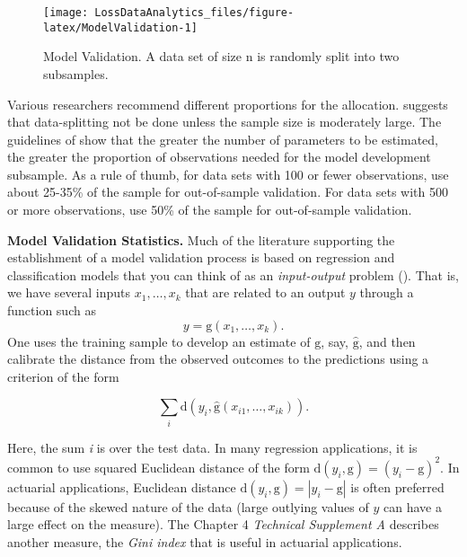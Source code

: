 \documentclass[]{book}
\theoremstyle{definition}
\theoremstyle{definition}
\theoremstyle{definition}
\theoremstyle{remark}
\begin{document}
\begin{figure}

{\centering \texttt{[image: LossDataAnalytics\_files/figure-latex/ModelValidation-1]} 

}

\caption{Model Validation. A data set of size n is randomly split into two subsamples.}\label{fig:ModelValidation}
\end{figure}

Various researchers recommend different proportions for the allocation.
\citet{snee1977validation} suggests that data-splitting not be done
unless the sample size is moderately large. The guidelines of
\citet{picard1990data} show that the greater the number of parameters to
be estimated, the greater the proportion of observations needed for the
model development subsample. As a rule of thumb, for data sets with 100
or fewer observations, use about 25-35\% of the sample for out-of-sample
validation. For data sets with 500 or more observations, use 50\% of the
sample for out-of-sample validation.

\textbf{Model Validation Statistics.} Much of the literature supporting
the establishment of a model validation process is based on regression
and classification models that you can think of as an
\emph{input-output} problem (\citet{james2013introduction}). That is, we
have several inputs \(x_1, \ldots, x_k\) that are related to an output
\(y\) through a function such as
\[y = \mathrm{g}\left(x_1, \ldots, x_k\right).\] One uses the training
sample to develop an estimate of \(\mathrm{g}\), say,
\(\hat{\mathrm{g}}\), and then calibrate the distance from the observed
outcomes to the predictions using a criterion of the form

\begin{equation}
\sum_i \mathrm{d}(y_i,\hat{\mathrm{g}}\left(x_{i1}, \ldots, x_{ik}\right) ) .
\label{eq:OutSampleCriter}
\end{equation}

Here, the sum \emph{i} is over the test data. In many regression
applications, it is common to use squared Euclidean distance of the form
\(\mathrm{d}(y_i,\mathrm{g}) = (y_i-\mathrm{g})^2\). In actuarial
applications, Euclidean distance
\(\mathrm{d}(y_i,\mathrm{g}) = |y_i-\mathrm{g}|\) is often preferred
because of the skewed nature of the data (large outlying values of \(y\)
can have a large effect on the measure). The Chapter 4 \emph{Technical
Supplement A} describes another measure, the \emph{Gini index} that is
useful in actuarial applications.
\end{document}
